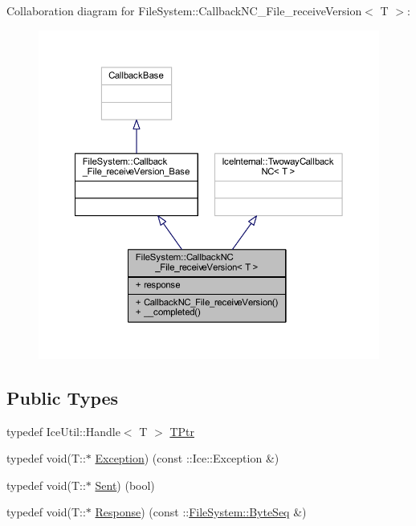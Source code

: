 Collaboration diagram for File\+System\+:\+:Callback\+N\+C\+\_\+\+File\+\_\+receive\+Version$<$ T $>$\+:
\nopagebreak
\begin{figure}[H]
\begin{center}
\leavevmode
\includegraphics[width=350pt]{class_file_system_1_1_callback_n_c___file__receive_version__coll__graph}
\end{center}
\end{figure}
\subsection*{Public Types}
\begin{DoxyCompactItemize}
\item 
typedef Ice\+Util\+::\+Handle$<$ T $>$ \hyperlink{class_file_system_1_1_callback_n_c___file__receive_version_a4bb40a1c1a5f5407c5c42bf0ee950065}{T\+Ptr}
\item 
typedef void(T\+::$\ast$ \hyperlink{class_file_system_1_1_callback_n_c___file__receive_version_a852c42ee48702dc3f7fe6c0301755500}{Exception}) (const \+::Ice\+::\+Exception \&)
\item 
typedef void(T\+::$\ast$ \hyperlink{class_file_system_1_1_callback_n_c___file__receive_version_ab1b34ba3456b31c2a30649702a73c7a6}{Sent}) (bool)
\item 
typedef void(T\+::$\ast$ \hyperlink{class_file_system_1_1_callback_n_c___file__receive_version_aa60cb3d411660e0c5d1c38f3d2fd6977}{Response}) (const \+::\hyperlink{namespace_file_system_a5c85de065f9c451ae1d1dea2dacb68c5}{File\+System\+::\+Byte\+Seq} \&)
\end{DoxyCompactItemize}
